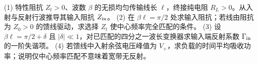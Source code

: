 (1) 特性阻抗 \(Z_t>0\)、波数 \(\beta\) 的无损均匀传输线长 \(\ell\)，终接纯电阻 \(R_L>0\)。从入射与反射行波推导其输入阻抗 \(Z_{\rm in}\)。
(2) 在 \(\beta\ell=\pi/2\) 处求输入阻抗；若线由阻抗为 \(Z_0>0\) 的馈线驱动，求选择 \(Z_t\) 使中心频率完全匹配的条件。
(3) 设 \(\beta\ell=\pi/2+\delta\) 且 \(|\delta|\ll1\)，对已匹配的四分之一波长变换器求输入端反射系数 \(\Gamma_{\rm in}\) 的一阶失谐项。
(4) 若馈线中入射余弦电压峰值为 \(V_+\)，求负载的时间平均吸收功率；说明仅中心频率匹配不意味着宽带无反射。
